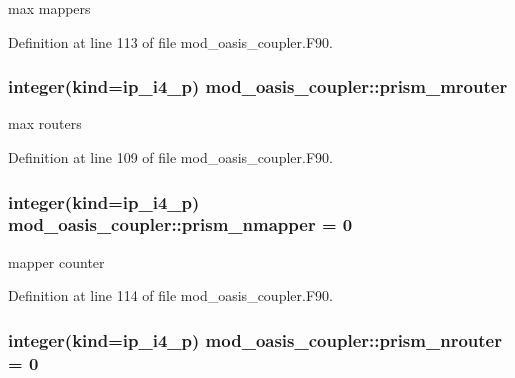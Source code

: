 max mappers 



Definition at line 113 of file mod\+\_\+oasis\+\_\+coupler.\+F90.

\hypertarget{classmod__oasis__coupler_a6d46883e9df70ab9cdafaf607afacacb}{
\subsubsection[{prism\+\_\+mrouter}]{\setlength{\rightskip}{0pt plus 5cm}integer(kind=ip\+\_\+i4\+\_\+p) mod\+\_\+oasis\+\_\+coupler\+::prism\+\_\+mrouter\hspace{0.3cm}{\ttfamily [private]}}}\label{classmod__oasis__coupler_a6d46883e9df70ab9cdafaf607afacacb}


max routers 



Definition at line 109 of file mod\+\_\+oasis\+\_\+coupler.\+F90.

\hypertarget{classmod__oasis__coupler_afc07469eb6600d0bef40148e61c0f336}{
\subsubsection[{prism\+\_\+nmapper}]{\setlength{\rightskip}{0pt plus 5cm}integer(kind=ip\+\_\+i4\+\_\+p) mod\+\_\+oasis\+\_\+coupler\+::prism\+\_\+nmapper = 0\hspace{0.3cm}{\ttfamily [private]}}}\label{classmod__oasis__coupler_afc07469eb6600d0bef40148e61c0f336}


mapper counter 



Definition at line 114 of file mod\+\_\+oasis\+\_\+coupler.\+F90.

\hypertarget{classmod__oasis__coupler_a2ebdb255598e1b004de2533f16b06e04}{
\subsubsection[{prism\+\_\+nrouter}]{\setlength{\rightskip}{0pt plus 5cm}integer(kind=ip\+\_\+i4\+\_\+p) mod\+\_\+oasis\+\_\+coupler\+::prism\+\_\+nrouter = 0\hspace{0.3cm}{\ttfamily [private]}}}\label{classmod__oasis__coupler_a2ebdb255598e1b004de2533f16b06e04}


